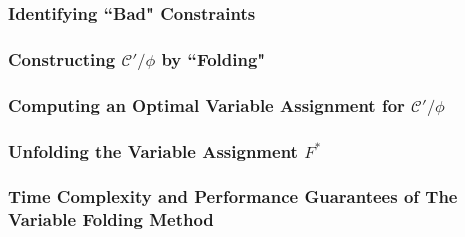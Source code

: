 \subsubsection{Identifying ``Bad" Constraints}

\subsubsection{Constructing $\mathcal{C}'/\phi$ by ``Folding"}

\subsubsection{Computing an Optimal Variable Assignment for $\mathcal{C}'/\phi$}

\subsubsection{Unfolding the Variable Assignment $F^*$}

\subsubsection{Time Complexity and Performance Guarantees of The Variable Folding Method}

%